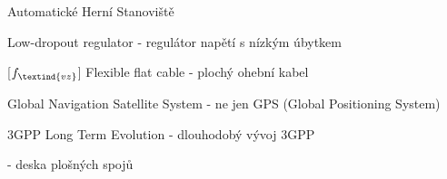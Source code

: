 \cleardoublepage
\chapter*{\listofabbrevname}
{}

\begin{acronym}[KolikMista]

		{Automatické Herní Stanoviště}

		{Low-dropout regulator - regulátor napětí s nízkým úbytkem}

		[\ensuremath{f_\textind{vz}}] %
		{Flexible flat cable - plochý ohební kabel}					%

		{Global Navigation Satellite System - ne jen GPS (Global Positioning System)}
	
		{3GPP Long Term Evolution - dlouhodobý vývoj 3GPP}

		{ - deska plošných spojů}

\end{acronym}

